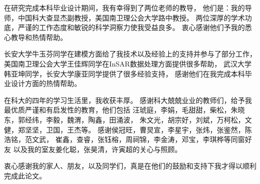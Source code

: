 
\begin{acknowledgements}

在研究完成本科毕业设计期间，我有幸得到了两位老师的教导，
他们是：我的导师，中国科大查显杰副教授，美国南卫理公会大学路中教授。
两位深厚的学术功底，严谨的工作态度和敏锐的科学洞察力使我受益良多。
衷心感谢他们予我的悉心教导和热情帮助。

长安大学牛玉芬同学在建模方面给了我技术以及经验上的支持并参与了部分工作，
美国南卫理公会大学王佳辉同学在InSAR数据处理方面提供很多帮助，
武汉大学韩亚坤同学，长安大学康亚同学提供了很多经验支持，
感谢他们在我完成本科毕业设计方面的热情帮助。

在科大的四年的学习生活里，我收获丰厚。
感谢科大兢兢业业的教师们，给予我最优质严谨和有启发性的教育，他们包括
汪琥庭，李娟，毛甜甜，柴松，朱晓东，郭经纬，李毅，魏渭，陶鑫，田涌波，
朱文光，胡宗好，刘斌，万柯松，文健，郑坚坚，卫国，王杰等。
感谢侯冠旺，曹炅宣，李星宇，张炜，张鉴然，陈浩铭，范文武，
崔鑫，查睿，张钰榕，周祠锦，李金涛，邓宝，李琪桦等同窗好友
以及我的室友姜化聪，张昊清，许寅超的关心与照顾。

衷心感谢我的家人、朋友，以及同学们，真是在他们的鼓励和支持下我才得以顺利完成此论文。

\end{acknowledgements}
